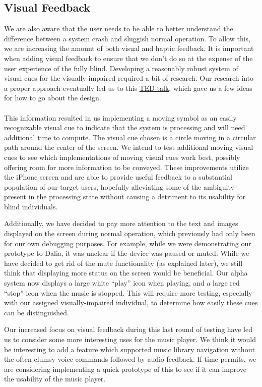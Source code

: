 \documentclass[10pt,letterpaper]{article}
\begin{document}
\subsection*{Visual Feedback}
We are also aware that the user needs to be able to better understand the difference between a system crash and sluggish normal operation. To allow this, we are increasing the amount of both visual and haptic feedback. It is important when adding visual feedback to ensure that we don't do so at the expense of the user experience of the fully blind. Developing a reasonably robust system of visual cues for the visually impaired required a bit of research. Our research into a proper approach eventually led us to this \href{http://www.ted.com/talks/lang/eng/pawan\_sinha\_on\_how\_brains\_learn\_to\_see.html}{TED talk}, which gave us a few ideas for how to go about the design.
\\ \\
This information resulted in us implementing a moving symbol as an easily recognizable visual cue to indicate that the system is processing and will need additional time to compute. The visual cue chosen is a circle moving in a circular path around the center of the screen. We intend to test additional moving visual cues to see which implementations of moving visual cues work best, possibly offering room for more information to be conveyed. These improvements utilize the iPhone screen and are able to provide useful feedback to a substantial population of our target users, hopefully alleviating some of the ambiguity present in the processing state without causing a detriment to its usability for blind individuals.

Additionally, we have decided to pay more attention to the text and images displayed on the screen during normal operation, which previously had only been for our own debugging purposes. For example, while we were demonstrating our prototype to Dalia, it was unclear if the device was paused or muted. While we have decided to get rid of the mute functionality (as explained later), we still think that displaying more status on the screen would be beneficial. Our alpha system now displays a large white ``play'' icon when playing, and a large red ``stop'' icon when the music is stopped. This will require more testing, especially with our assigned visually-impaired individual, to determine how easily these cues can be distinguished.

Our increased focus on visual feedback during this last round of testing have led us to consider some more interesting uses for the music player. We think it would be interesting to add a feature which supported music library navigation without the often clumsy voice commands followed by audio feedback. If time permits, we are considering implementing a quick prototype of this to see if it can improve the usability of the music player.
\end{document}
